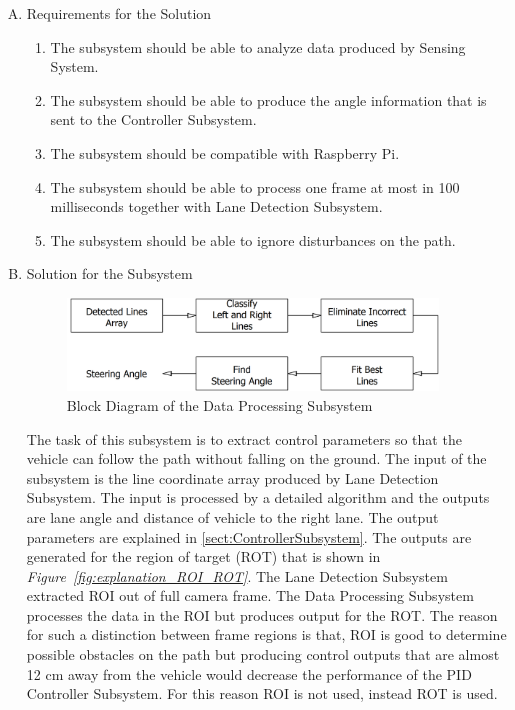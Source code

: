 \documentclass[a4paper,12pt]{article}
\begin{document}
\begin{enumerate}[A.]

\item {Requirements for the Solution}


\begin{enumerate}[1)]

\item The subsystem should be able to analyze data produced by Sensing System.

\item The subsystem should be able to produce the angle information that is sent to the Controller Subsystem.

\item The subsystem should be compatible with Raspberry Pi.

\item The subsystem should be able to process one frame at most in 100 milliseconds together with Lane Detection Subsystem.

\item The subsystem should be able to ignore disturbances on the path.

\end{enumerate}


\item {Solution for the Subsystem}

\begin{figure}[h]

\includegraphics[width=0.93\textwidth,center]{images/vModels/dataProcessing_subsystem}

\caption{Block Diagram of the Data Processing Subsystem}\label{fig:dataProcessing_subsystem}

\end{figure}



The task of this subsystem is to extract control parameters so that the vehicle can follow the path without falling on the ground. The input of the subsystem is the line coordinate array produced by Lane Detection Subsystem. The input is processed by a detailed algorithm and the outputs are lane angle and distance of vehicle to the right lane. The output parameters are explained in \ref{sect:ControllerSubsystem}. The outputs are generated for the region of target (ROT) that is shown in \textit{Figure~\ref{fig:explanation_ROI_ROT}}. The Lane Detection Subsystem extracted ROI out of full camera frame. The Data Processing Subsystem processes the data in the ROI but produces output for the ROT. The reason for such a distinction between frame regions is that, ROI is good to determine possible obstacles on the path but producing control outputs that are almost 12 cm away from the vehicle would decrease the performance of the PID Controller Subsystem. For this reason ROI is not used, instead ROT is used.


\end{enumerate}
\end{document}
